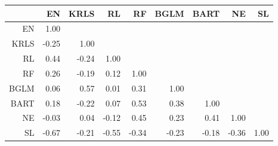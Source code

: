 \begin{table}[ht]
\centering
\begin{tabular}{rrrrrrrrr}
  \hline
 & EN & KRLS & RL & RF & BGLM & BART & NE & SL \\ 
  \hline
EN & 1.00 &  &  &  &  &  &  &  \\ 
  KRLS & -0.25 & 1.00 &  &  &  &  &  &  \\ 
  RL & 0.44 & -0.24 & 1.00 &  &  &  &  &  \\ 
  RF & 0.26 & -0.19 & 0.12 & 1.00 &  &  &  &  \\ 
  BGLM & 0.06 & 0.57 & 0.01 & 0.31 & 1.00 &  &  &  \\ 
  BART & 0.18 & -0.22 & 0.07 & 0.53 & 0.38 & 1.00 &  &  \\ 
  NE & -0.03 & 0.04 & -0.12 & 0.45 & 0.23 & 0.41 & 1.00 &  \\ 
  SL & -0.67 & -0.21 & -0.55 & -0.34 & -0.23 & -0.18 & -0.36 & 1.00 \\ 
   \hline
\end{tabular}
\end{table}
